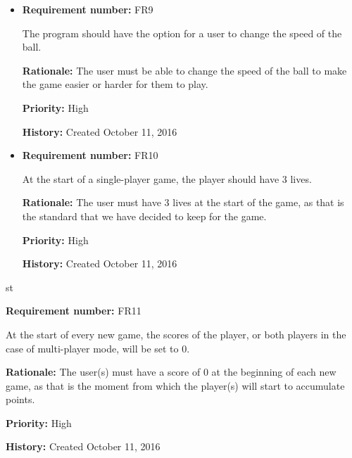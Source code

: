 \documentclass[12pt,letterpaper]{article}
\begin{document}
\begin{reqbox}
\end{reqbox}

\begin{reqbox}
	\begin{itemize}
		\item \textbf{Requirement number: }FR9

		The program should have the option for a user to change the speed of the ball.

		\textbf{Rationale: }The user must be able to change the speed of the ball to make the game easier or harder for them to play.

		\textbf{Priority: }High

		\textbf{History: }Created October 11, 2016
	\end{itemize}
\end{reqbox}

\begin{reqbox}
	\begin{itemize}
		\item \textbf{Requirement number: }FR10

		At the start of a single-player game, the player should have 3 lives.

		\textbf{Rationale: }The user must have 3 lives at the start of the game, as that is the standard that we have decided to keep for the game.

		\textbf{Priority: }High

		\textbf{History: }Created October 11, 2016
	\end{itemize}
\end{reqbox}

\begin{reqbox}
	\begin{itemize}
st{
		\item \textbf{Requirement number: }FR11

		At the start of every new game, the scores of the player, or both players in the case of multi-player mode, will be set to 0.

		\textbf{Rationale: }The user(s) must have a score of 0 at the beginning of each new game, as that is the moment from which the player(s) will start to accumulate points.

		\textbf{Priority: }High

		\textbf{History: }Created October 11, 2016
}
	\end{itemize}
\end{reqbox}
\end{document}
